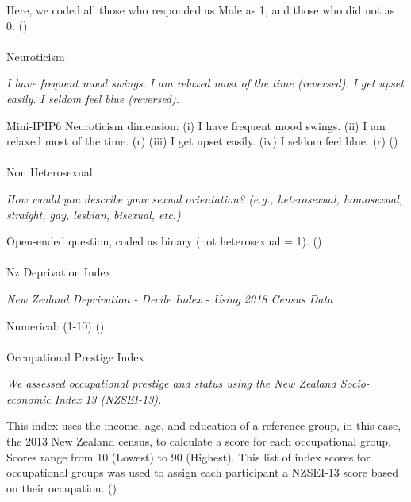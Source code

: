 \documentclass[
  single column]{article}
\makeatletter
\let\oldparagraph\paragraph
\renewcommand{\paragraph}{
    \@ifstar
      \xxxParagraphStar
      \xxxParagraphNoStar
  }
\newcommand{\xxxParagraphStar}[1]{\oldparagraph*{#1}\mbox{}}
\newcommand{\xxxParagraphNoStar}[1]{\oldparagraph{#1}\mbox{}}
\makeatother
\begin{document}
Here, we coded all those who responded as Male as 1, and those who did
not as 0. ()

\paragraph{Neuroticism}\label{neuroticism}

\emph{I have frequent mood swings.} \emph{I am relaxed most of the time
(reversed).} \emph{I get upset easily.} \emph{I seldom feel blue
(reversed).}

Mini-IPIP6 Neuroticism dimension: (i) I have frequent mood swings. (ii)
I am relaxed most of the time. (r) (iii) I get upset easily. (iv) I
seldom feel blue. (r) ()

\paragraph{Non Heterosexual}\label{non-heterosexual}

\emph{How would you describe your sexual orientation? (e.g.,
heterosexual, homosexual, straight, gay, lesbian, bisexual, etc.)}

Open-ended question, coded as binary (not heterosexual = 1).
()

\paragraph{Nz Deprivation Index}\label{nz-deprivation-index}

\emph{New Zealand Deprivation - Decile Index - Using 2018 Census Data}

Numerical: (1-10) ()

\paragraph{Occupational Prestige
Index}\label{occupational-prestige-index}

\emph{We assessed occupational prestige and status using the New Zealand
Socio-economic Index 13 (NZSEI-13).}

This index uses the income, age, and education of a reference group, in
this case, the 2013 New Zealand census, to calculate a score for each
occupational group. Scores range from 10 (Lowest) to 90 (Highest). This
list of index scores for occupational groups was used to assign each
participant a NZSEI-13 score based on their occupation.
()
\end{document}
